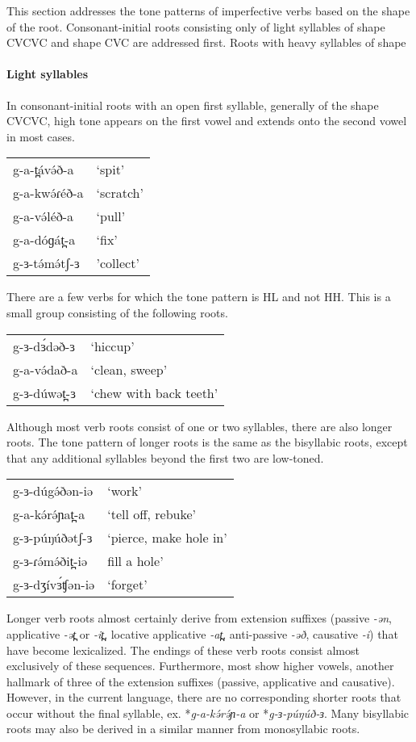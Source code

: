 This section addresses the tone patterns of imperfective verbs based on the shape of the root. Consonant-initial roots consisting only of light syllables of shape CVCVC and shape CVC are addressed first. Roots with heavy syllables of shape 


\paragraph{Light syllables} In consonant-initial roots with an open first syllable, generally of the shape CVCVC, high tone appears on the first vowel and extends onto the second vowel in most cases.

\ea \begin{tabular}[t]{ll}	
g-a-t̪ávə́ð-a	&‘spit’\\
g-a-kwə́ɾéð-a&	‘scratch’\\
g-a-və́léð-a	&‘pull’\\
g-a-dóɡát̪-a	&‘fix’\\
g-ɜ-tə́mə́tʃ-ɜ&	'collect'\\
\end{tabular}\z 
There are a few verbs for which the tone pattern is HL and not HH. This is a small group consisting of the following roots. 
\ea 	
\begin{tabular}[t]{ll}
g-ɜ-dɜ́dəð-ɜ	&	`hiccup'\\
g-a-və́dað-a	&	‘clean, sweep'\\
g-ɜ-dúwət̪-ɜ	&	`chew with back teeth' \\	
\end{tabular}
\z 

Although most verb roots consist of one or two syllables, there are also longer roots. The tone pattern of longer roots is the same as the bisyllabic roots, except that any additional syllables beyond the first two are low-toned.

\ea 	
\begin{tabular}[t]{ll}
g-ɜ-dúgə́ðən-iə	&	`work'\\
g-a-kə́rə́ɲat̪-a		&	`tell off, rebuke'\\
g-ɜ-púŋúðətʃ-ɜ	&	`pierce, make hole in'\\
g-ɜ-ɾə́mə́ðit̪-iə		&	fill a hole'\\
g-ɜ-dʒívɜ́ʧən-iə	&	`forget'\\	
\end{tabular}
\z 
Longer verb roots almost certainly derive from extension suffixes (passive \textit{-ən}, applicative \textit{-ət̪} or \textit{-it̪}, locative applicative \textit{-at̪}, anti-passive \textit{-əð}, causative \textit{-i}) that have become lexicalized. The endings of these verb roots consist almost exclusively of these sequences. Furthermore, most show higher vowels, another hallmark of three of the extension suffixes (passive, applicative and causative). However, in the current language, there are no corresponding shorter roots that occur without the final syllable, ex. *\textit{g-a-kə́rə́ɲ-a} or *\textit{g-ɜ-púŋúð-ɜ}. Many bisyllabic roots may also be derived in a similar manner from monosyllabic roots. 

